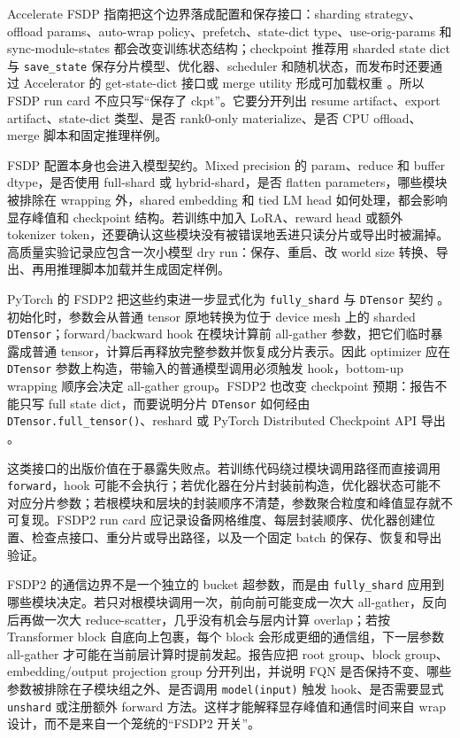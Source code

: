 \documentclass[UTF8,zihao=-4,openany]{ctexbook}
\begin{document}
Accelerate FSDP 指南把这个边界落成配置和保存接口：sharding strategy、offload params、auto-wrap policy、prefetch、state-dict type、use-orig-params 和 sync-module-states 都会改变训练状态结构；checkpoint 推荐用 sharded state dict 与 \texttt{save\_state} 保存分片模型、优化器、scheduler 和随机状态，而发布时还要通过 Accelerator 的 get-state-dict 接口或 merge utility 形成可加载权重 \cite{huggingface2026acceleratefsdp}。所以 FSDP run card 不应只写“保存了 ckpt”。它要分开列出 resume artifact、export artifact、state-dict 类型、是否 rank0-only materialize、是否 CPU offload、merge 脚本和固定推理样例。

FSDP 配置本身也会进入模型契约。Mixed precision 的 param、reduce 和 buffer dtype，是否使用 full-shard 或 hybrid-shard，是否 flatten parameters，哪些模块被排除在 wrapping 外，shared embedding 和 tied LM head 如何处理，都会影响显存峰值和 checkpoint 结构。若训练中加入 LoRA、reward head 或额外 tokenizer token，还要确认这些模块没有被错误地丢进只读分片或导出时被漏掉。高质量实验记录应包含一次小模型 dry run：保存、重启、改 world size 转换、导出、再用推理脚本加载并生成固定样例。

PyTorch 的 FSDP2 把这些约束进一步显式化为 \texttt{fully\_shard} 与 \texttt{DTensor} 契约 \cite{pytorch2026fsdp2}。初始化时，参数会从普通 tensor 原地转换为位于 device mesh 上的 sharded \texttt{DTensor}；forward/backward hook 在模块计算前 all-gather 参数，把它们临时暴露成普通 tensor，计算后再释放完整参数并恢复成分片表示。因此 optimizer 应在 \texttt{DTensor} 参数上构造，带输入的普通模型调用必须触发 hook，bottom-up wrapping 顺序会决定 all-gather group。FSDP2 也改变 checkpoint 预期：报告不能只写 full state dict，而要说明分片 \texttt{DTensor} 如何经由 \texttt{DTensor.full\_tensor()}、reshard 或 PyTorch Distributed Checkpoint API 导出 \cite{pytorch2026distributedcheckpoint}。

这类接口的出版价值在于暴露失败点。若训练代码绕过模块调用路径而直接调用 \texttt{forward}，hook 可能不会执行；若优化器在分片封装前构造，优化器状态可能不对应分片参数；若根模块和层块的封装顺序不清楚，参数聚合粒度和峰值显存就不可复现。FSDP2 run card 应记录设备网格维度、每层封装顺序、优化器创建位置、检查点接口、重分片或导出路径，以及一个固定 batch 的保存、恢复和导出验证。

FSDP2 的通信边界不是一个独立的 bucket 超参数，而是由 \texttt{fully\_shard} 应用到哪些模块决定。若只对根模块调用一次，前向前可能变成一次大 all-gather，反向后再做一次大 reduce-scatter，几乎没有机会与层内计算 overlap；若按 Transformer block 自底向上包裹，每个 block 会形成更细的通信组，下一层参数 all-gather 才可能在当前层计算时提前发起。报告应把 root group、block group、embedding/output projection group 分开列出，并说明 FQN 是否保持不变、哪些参数被排除在子模块组之外、是否调用 \texttt{model(input)} 触发 hook、是否需要显式 \texttt{unshard} 或注册额外 forward 方法。这样才能解释显存峰值和通信时间来自 wrap 设计，而不是来自一个笼统的“FSDP2 开关”。
\end{document}
